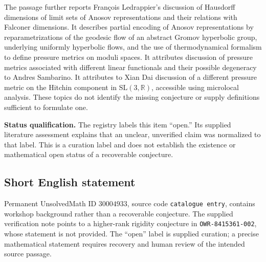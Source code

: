 \documentclass[11pt]{article}
\newcommand{\R}{\mathbb{R}}
\begin{document}
The passage further reports Fran\c{c}ois Ledrappier's discussion of Hausdorff dimensions of limit sets of Anosov representations and their relations with Falconer dimensions. It describes partial encoding of Anosov representations by reparametrizations of the geodesic flow of an abstract Gromov hyperbolic group, underlying uniformly hyperbolic flows, and the use of thermodynamical formalism to define pressure metrics on moduli spaces. It attributes discussion of pressure metrics associated with different linear functionals and their possible degeneracy to Andres Sambarino. It attributes to Xian Dai discussion of a different pressure metric on the Hitchin component in \(\mathrm{SL}(3,\R)\), accessible using microlocal analysis. These topics do not identify the missing conjecture or supply definitions sufficient to formulate one.

\textbf{Status qualification.} The registry labels this item ``open.'' Its supplied literature assessment explains that an unclear, unverified claim was normalized to that label. This is a curation label and does not establish the existence or mathematical open status of a recoverable conjecture.
\subsection{Short English statement}
Permanent UnsolvedMath ID \(30004933\), source code \texttt{catalogue entry}, contains workshop background rather than a recoverable conjecture. The supplied verification note points to a higher-rank rigidity conjecture in \texttt{OWR-8415361-002}, whose statement is not provided. The ``open'' label is supplied curation; a precise mathematical statement requires recovery and human review of the intended source passage.
\end{document}

